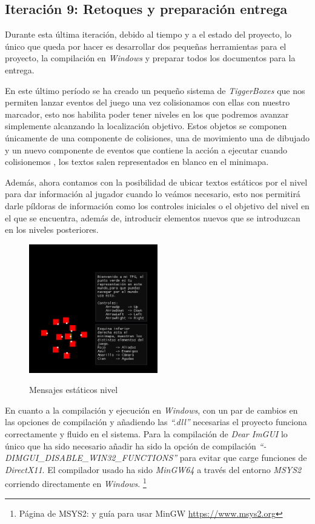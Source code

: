 \subsection*{Iteración 9: Retoques y preparación entrega}
Durante esta última iteración, debido al tiempo y a el estado del proyecto, lo único que queda por hacer
es desarrollar dos pequeñas herramientas para el proyecto, la compilación en \textit{Windows} y preparar
todos los documentos para la entrega.

En este último período se ha creado un pequeño sistema de \textit{TiggerBoxes} que nos permiten
lanzar eventos del juego una vez colisionamos con ellas con nuestro marcador, esto nos habilita
poder tener niveles en los que podremos avanzar simplemente alcanzando la localización objetivo.
Estos objetos se componen únicamente de una componente de colisiones, una de movimiento 
una de dibujado y un nuevo componente de eventos que contiene la acción a ejecutar cuando colisionemos
, los textos salen representados en blanco en el minimapa.

Además, ahora contamos con la posibilidad de ubicar textos estáticos por el nivel para dar información
al jugador cuando lo veámos necesario, esto nos permitirá darle píldoras de información como los controles
iniciales o el objetivo del nivel en el que se encuentra, además de, introducir elementos nuevos que se
introduzcan en los niveles posteriores.

\begin{figure}[ht]
\centering
\includegraphics[width=0.50\textwidth]{imagenes/diario_desarrollo/textos.png}\\
\caption{Mensajes estáticos nivel}
\label{fig:texts}
\end{figure}

En cuanto a la compilación y ejecución en \textit{Windows}, con un par de cambios en las opciones de
compilación y añadiendo las \textit{``.dll''} necesarias el proyecto funciona correctamente y fluido
en el sistema. Para la compilación de \textit{Dear ImGUI} lo único que ha sido necesario añadir ha sido
la opción de compilación \textit{``-DIMGUI\_DISABLE\_WIN32\_FUNCTIONS''} para evitar que carge funciones
de \textit{DirectX11}. El compilador usado ha sido \textit{MinGW64} a través del entorno \textit{MSYS2}
corriendo directamente en \textit{Windows}.
\footnote{Página de MSYS2: y guía para usar MinGW \url{https://www.msys2.org}} 

